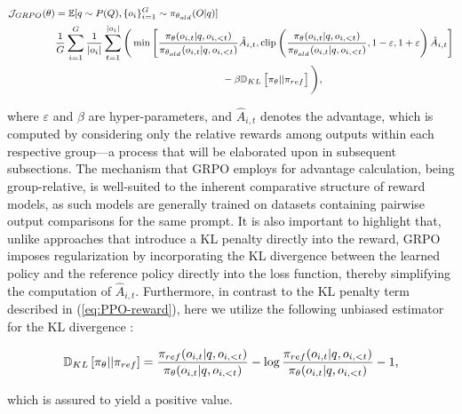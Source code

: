 \begin{itemize}[topsep=0pt]
\begin{equation}
\footnotesize
\begin{split}
    \mathcal{J}_{GRPO}(\theta) &= \mathbb{E}{[q \sim P(Q), \{o_i\}_{i=1}^G \sim \pi_{\theta_{old}}(O|q)]}  \\
    & \frac{1}{G}\sum_{i=1}^G\frac{1}{|o_i|} \sum_{t=1}^{|o_i|} \Bigg( \min \left[ \frac{\pi_\theta(o_{i,t} | q, o_{i,<t})}{\pi_{\theta_{old}}(o_{i,t} | q, o_{i,<t})} \hat{A}_{i,t}, \text{clip} \left( \frac{\pi_\theta(o_{i,t} | q, o_{i,<t})}{\pi_{\theta_{old}}(o_{i,t} | q, o_{i,<t})}, 1 - \varepsilon, 1 + \varepsilon \right)  \hat{A}_{i,t} \right] \\
    & \hspace{5cm} - \beta \mathbb{D}_{KL}\left[\pi_{\theta} || \pi_{ref}\right]\Bigg) ,
\end{split}
\label{eq:GRPO-obj}
\end{equation}

where $\varepsilon$ and $\beta$ are hyper-parameters, and $\hat{A}_{i,t}$ denotes the advantage, which is computed by considering only the relative rewards among outputs within each respective group—a process that will be elaborated upon in subsequent subsections. The mechanism that GRPO employs for advantage calculation, being group-relative, is well-suited to the inherent comparative structure of reward models, as such models are generally trained on datasets containing pairwise output comparisons for the same prompt. It is also important to highlight that, unlike approaches that introduce a KL penalty directly into the reward, GRPO imposes regularization by incorporating the KL divergence between the learned policy and the reference policy directly into the loss function, thereby simplifying the computation of $\hat{A}_{i,t}$. Furthermore, in contrast to the KL penalty term described in (\ref{eq:PPO-reward}), here we utilize the following unbiased estimator for the KL divergence \citep{kl_approx}:

\begin{equation}
\small
    \mathbb{D}_{KL}\left[\pi_{\theta} || \pi_{ref}\right] = \frac{\pi_{ref}(o_{i,t}|q,o_{i,<t})}{\pi_{\theta}(o_{i,t}|q,o_{i,<t})}- \log\frac{\pi_{ref}(o_{i,t}|q,o_{i,<t})}{\pi_{\theta}(o_{i,t}|q,o_{i,<t})} - 1,
\end{equation}

which is assured to yield a positive value.


\end{itemize}
